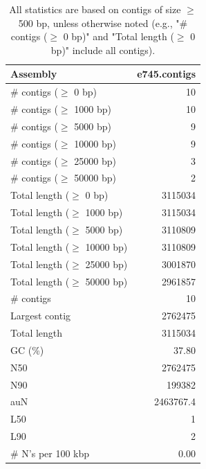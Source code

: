 \documentclass[12pt,a4paper]{article}
\begin{document}
\begin{table}[ht]
\begin{center}
\caption{All statistics are based on contigs of size $\geq$ 500 bp, unless otherwise noted (e.g., "\# contigs ($\geq$ 0 bp)" and "Total length ($\geq$ 0 bp)" include all contigs).}
\begin{tabular}{|l*{1}{|r}|}
\hline
Assembly & e745.contigs \\ \hline
\# contigs ($\geq$ 0 bp) & 10 \\ \hline
\# contigs ($\geq$ 1000 bp) & 10 \\ \hline
\# contigs ($\geq$ 5000 bp) & 9 \\ \hline
\# contigs ($\geq$ 10000 bp) & 9 \\ \hline
\# contigs ($\geq$ 25000 bp) & 3 \\ \hline
\# contigs ($\geq$ 50000 bp) & 2 \\ \hline
Total length ($\geq$ 0 bp) & 3115034 \\ \hline
Total length ($\geq$ 1000 bp) & 3115034 \\ \hline
Total length ($\geq$ 5000 bp) & 3110809 \\ \hline
Total length ($\geq$ 10000 bp) & 3110809 \\ \hline
Total length ($\geq$ 25000 bp) & 3001870 \\ \hline
Total length ($\geq$ 50000 bp) & 2961857 \\ \hline
\# contigs & 10 \\ \hline
Largest contig & 2762475 \\ \hline
Total length & 3115034 \\ \hline
GC (\%) & 37.80 \\ \hline
N50 & 2762475 \\ \hline
N90 & 199382 \\ \hline
auN & 2463767.4 \\ \hline
L50 & 1 \\ \hline
L90 & 2 \\ \hline
\# N's per 100 kbp & 0.00 \\ \hline
\end{tabular}
\end{center}
\end{table}
\end{document}
